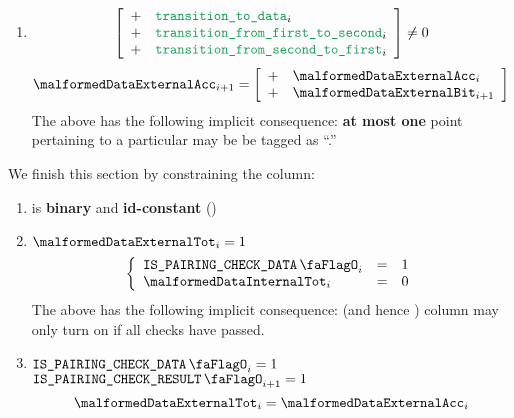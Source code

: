 \begin{enumerate}[resume]
    \item \If
        \[
            \left[ \begin{array}{cl}
                + & \locTransitionToData            _{i} \\
                + & \locTransitionFromFirstToSecond _{i} \\
                + & \locTransitionFromSecondToFirst _{i} \\
            \end{array} \right]
            \neq 0
        \]
        \Then
        \[
            \malformedDataExternalAcc _{i + 1} =
            \left[ \begin{array}{cl}
                + & \malformedDataExternalAcc _{i}     \\
                + & \malformedDataExternalBit _{i + 1} \\
            \end{array} \right]
        \]
        \saNote{} The above has the following implicit consequence: \textbf{at most one} point pertaining to a particular \blsId{} may be be tagged as ``\malformedDataExternalBit.''
\end{enumerate}
We finish this section by constraining the \malformedDataExternalTot{} column:
\begin{enumerate}[resume]
    \item \malformedDataExternalTot{} is \textbf{binary} and \textbf{id-constant} \quad (\trash)
    \item \If $\malformedDataExternalTot_{i} = 1$ \Then
        \[
            \left\{ \begin{array}{lcl}
                \isBlsPairingCheckData              _{i} & = & 1 \\
                \malformedDataInternalTot _{i} & = & 0 \\
            \end{array} \right.
        \]
        \saNote{} The above has the following implicit consequence: \malformedDataExternalAcc{} (and hence \malformedDataExternalBit{}) column may only turn on if all checks have passed.
    \item \If $\isBlsPairingCheckData _{i} = 1$ \et $\isBlsPairingCheckResult _{i + 1} = 1$ \Then
        \[
            \malformedDataExternalTot_{i} = \malformedDataExternalAcc _{i}
        \]
\end{enumerate}
